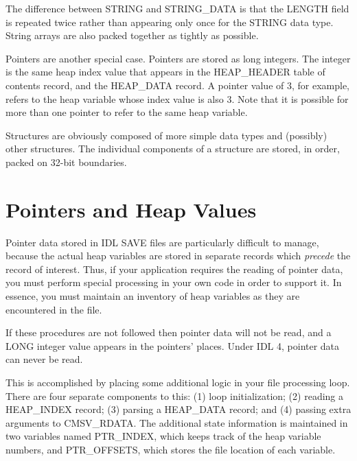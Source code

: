 \documentclass[12pt]{article}
\begin{document}
The difference between STRING and STRING\_DATA is that the LENGTH
field is repeated twice rather than appearing only once for the STRING
data type.   String arrays are also packed
together as tightly as possible.  

Pointers are another special case.  Pointers are stored as long
integers.  The integer is the same heap index value that appears in
the HEAP\_HEADER table of contents record, and the HEAP\_DATA record.
A pointer value of 3, for example, refers to the heap variable whose
index value is also 3.  Note that it is possible for more than one
pointer to refer to the same heap variable.

Structures are obviously composed of more simple data types and
(possibly) other structures.  The individual components of a structure
are stored, in order, packed on 32-bit boundaries.

\section{Pointers and Heap Values\label{s:pointer}}

Pointer data stored in IDL SAVE files are particularly difficult
to manage, because the actual heap variables are stored in
separate records which {\it precede\/} the record of interest.  Thus, if
your application requires the reading of pointer data, you must
perform special processing in your own code in order to support
it.  In essence, you must maintain an inventory of heap variables
as they are encountered in the file.

If these procedures are not followed then pointer data will not be
read, and a LONG integer value appears in the pointers' places.
Under IDL 4, pointer data can never be read.

This is accomplished by placing some additional logic in your file
processing loop.  There are four separate components to this: (1)
loop initialization; (2) reading a HEAP\_INDEX record; (3) parsing
a HEAP\_DATA record; and (4) passing extra arguments to CMSV\_RDATA.
The additional state information is maintained in two variables
named PTR\_INDEX, which keeps track of the heap variable numbers,
and PTR\_OFFSETS, which stores the file location of each variable.
\end{document}
